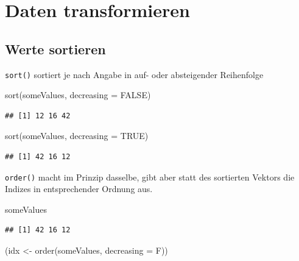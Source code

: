 \documentclass[
]{book}
\newenvironment{Shaded}{\begin{snugshade}}{\end{snugshade}}
\newcommand{\AttributeTok}[1]{\textcolor[rgb]{0.77,0.63,0.00}{#1}}
\newcommand{\ConstantTok}[1]{\textcolor[rgb]{0.00,0.00,0.00}{#1}}
\newcommand{\FunctionTok}[1]{\textcolor[rgb]{0.00,0.00,0.00}{#1}}
\newcommand{\NormalTok}[1]{#1}
\newcommand{\OtherTok}[1]{\textcolor[rgb]{0.56,0.35,0.01}{#1}}
\begin{document}
\hypertarget{daten-transformieren}{%
\section{Daten transformieren}\label{daten-transformieren}}

\hypertarget{werte-sortieren}{%
\subsection{Werte sortieren}\label{werte-sortieren}}

\texttt{sort()} sortiert je nach Angabe in auf- oder absteigender Reihenfolge

\begin{Shaded}
\begin{Highlighting}[]
\FunctionTok{sort}\NormalTok{(someValues, }\AttributeTok{decreasing =} \ConstantTok{FALSE}\NormalTok{)}
\end{Highlighting}
\end{Shaded}

\begin{verbatim}
## [1] 12 16 42
\end{verbatim}

\begin{Shaded}
\begin{Highlighting}[]
\FunctionTok{sort}\NormalTok{(someValues, }\AttributeTok{decreasing =} \ConstantTok{TRUE}\NormalTok{)}
\end{Highlighting}
\end{Shaded}

\begin{verbatim}
## [1] 42 16 12
\end{verbatim}

\texttt{order()} macht im Prinzip dasselbe, gibt aber statt des sortierten Vektors die Indizes in entsprechender Ordnung aus.

\begin{Shaded}
\begin{Highlighting}[]
\NormalTok{someValues}
\end{Highlighting}
\end{Shaded}

\begin{verbatim}
## [1] 42 16 12
\end{verbatim}

\begin{Shaded}
\begin{Highlighting}[]
\NormalTok{(idx }\OtherTok{\textless{}{-}} \FunctionTok{order}\NormalTok{(someValues, }\AttributeTok{decreasing =}\NormalTok{ F))}
\end{Highlighting}
\end{Shaded}
\end{document}
